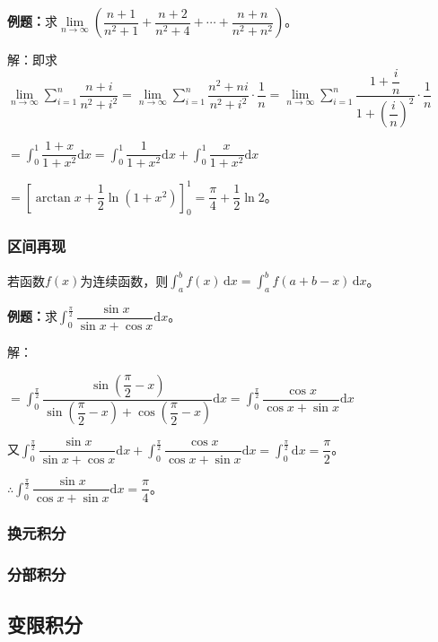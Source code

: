 \documentclass[UTF8, 12pt]{ctexart}
\begin{document}
\textbf{例题：}求$\lim\limits_{n\to\infty}\left(\dfrac{n+1}{n^2+1}+\dfrac{n+2}{n^2+4}+\cdots+\dfrac{n+n}{n^2+n^2}\right)$。

解：即求$\lim\limits_{n\to\infty}\sum\limits_{i=1}^n\dfrac{n+i}{n^2+i^2}=\lim\limits_{n\to\infty}\sum\limits_{i=1}^n\dfrac{n^2+ni}{n^2+i^2}\cdot\dfrac{1}{n}=\lim\limits_{n\to\infty}\sum\limits_{i=1}^n\dfrac{1+\dfrac{i}{n}}{1+\left(\dfrac{i}{n}\right)^2}\cdot\dfrac{1}{n}$

$=\displaystyle{\int_0^1\dfrac{1+x}{1+x^2}\textrm{d}x}=\displaystyle{\int_0^1\dfrac{1}{1+x^2}\textrm{d}x+\int_0^1\dfrac{x}{1+x^2}\textrm{d}x}$

$=\left[\arctan x+\dfrac{1}{2}\ln(1+x^2)\right]_0^1=\dfrac{\pi}{4}+\dfrac{1}{2}\ln2$。

\subsubsection{区间再现}

若函数$f(x)$为连续函数，则$\int_a^bf(x)\,\textrm{d}x=\int_a^bf(a+b-x)\,\textrm{d}x$。

\textbf{例题：}求$\displaystyle{\int_0^\frac{\pi}{2}\dfrac{\sin x}{\sin x+\cos x}\textrm{d}x}$。

解：


$=\displaystyle{\int_0^\frac{\pi}{2}\dfrac{\sin(\dfrac{\pi}{2}-x)}{\sin(\dfrac{\pi}{2}-x)+\cos(\dfrac{\pi}{2}-x)}\textrm{d}x=\int_0^\frac{\pi}{2}\dfrac{\cos x}{\cos x+\sin x}\textrm{d}x}$

又$\displaystyle{\int_0^\frac{\pi}{2}\dfrac{\sin x}{\sin x+\cos x}\textrm{d}x+\int_0^\frac{\pi}{2}\dfrac{\cos x}{\cos x+\sin x}\textrm{d}x}$$=\int_0^\frac{\pi}{2}\textrm{d}x=\dfrac{\pi}{2}$。

$\therefore\displaystyle{\int_0^\frac{\pi}{2}\dfrac{\sin x}{\cos x+\sin x}\textrm{d}x}=\dfrac{\pi}{4}$。

\subsubsection{换元积分}

\subsubsection{分部积分}

\subsection{变限积分}
\end{document}
